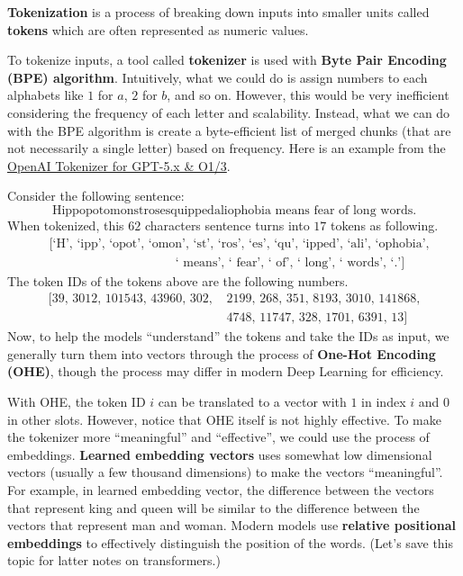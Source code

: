 \documentclass[../../main.tex]{subfiles}
\begin{document}
\begin{definition}{}{}
\textbf{Tokenization} is a process of breaking down inputs
into smaller units called \textbf{tokens} which are often
represented as numeric values.
\end{definition}

To tokenize inputs, a tool called \textbf{tokenizer} is
used with \textbf{Byte Pair Encoding (BPE) algorithm}.
Intuitively, what we could do is assign numbers to each
alphabets like $1$ for $a$, $2$ for $b$, and so on. However,
this would be very inefficient considering the frequency of
each letter and scalability. Instead, what we can do with
the BPE algorithm is create a byte-efficient list of
merged chunks (that are not necessarily a single letter)
based on frequency. Here is an example from the
\href{https://platform.openai.com/tokenizer}{OpenAI Tokenizer
for GPT-5.x \& O1/3}.

Consider the following sentence:
\[
\text{Hippopotomonstrosesquippedaliophobia means fear of long words.}
\]
When tokenized, this $62$ characters sentence turns into $17$
tokens as following.
\begin{align*}
    &\text{[`H', `ipp', `opot', `omon', `st', `ros', `es', `qu',
            `ipped', `ali', `ophobia',} \\
    &\qquad\qquad\qquad\qquad\qquad
    \text{` means', ` fear', ` of', ` long',
          ` words', `.']}
\end{align*}
The token IDs of the tokens above are the following numbers.
\begin{align*}
    \text{[39, 3012, 101543, 43960, 302, }
    &\text{2199, 268, 351, 8193, 3010, 141868,} \\
    &\text{4748, 11747, 328, 1701, 6391, 13]}
\end{align*}
Now, to help the models ``understand'' the tokens and take
the IDs as input, we generally turn them into vectors through
the process of \textbf{One-Hot Encoding (OHE)}, though the process
may differ in modern Deep Learning for efficiency.

With OHE, the token ID $i$ can be translated to a vector with
$1$ in index $i$ and $0$ in other slots. However, notice that
OHE itself is not highly effective. To make the tokenizer
more ``meaningful'' and ``effective'', we could use the process
of embeddings. \textbf{Learned embedding vectors} uses somewhat
low dimensional vectors (usually a few thousand dimensions) to
make the vectors ``meaningful''. For example, in learned
embedding vector, the difference between the vectors that
represent king and queen will be similar to the difference
between the vectors that represent man and woman. Modern models
use \textbf{relative positional embeddings} to effectively
distinguish the position of the words. (Let's save this topic
for latter notes on transformers.)
\end{document}
